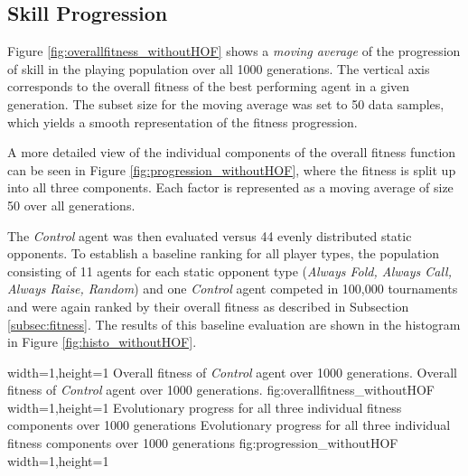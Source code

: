 \subsection{Skill Progression}
Figure \ref{fig:overallfitness_withoutHOF} shows a \textit{moving average} of the progression of skill in the playing population over all 1000 generations. The vertical axis corresponds to the overall fitness of the best performing agent in a given generation. The subset size for the moving average was set to 50 data samples, which yields a smooth representation of the fitness progression.\par
A more detailed view of the individual components of the overall fitness function can be seen in Figure \ref{fig:progression_withoutHOF}, where the fitness is split up into all three components. Each factor is represented as a moving average of size 50 over all generations.\par
{}
The \textit{Control} agent was then evaluated versus 44 evenly distributed static opponents. To establish a baseline ranking for all player types, the population consisting of 11 agents for each static opponent type (\textit{Always Fold, Always Call, Always Raise, Random}) and one \textit{Control} agent competed in 100,000 tournaments and were again ranked by their overall fitness as described in Subsection \ref{subsec:fitness}. The results of this baseline evaluation are shown in the histogram in Figure \ref{fig:histo_withoutHOF}. \par
{}%
  {width=1\textwidth,height=1\textheight}%
  {Overall fitness of \textit{Control} agent over 1000 generations.}%
  {Overall fitness of \textit{Control} agent over 1000 generations.}%
  {fig:overallfitness_withoutHOF}%
  {width=1\textwidth,height=1\textheight}%
  {Evolutionary progress for all three individual fitness components over 1000 generations}%
  {Evolutionary progress for all three individual fitness components over 1000 generations}%
  {fig:progression_withoutHOF}%
  {width=1\textwidth,height=1\textheight}%
